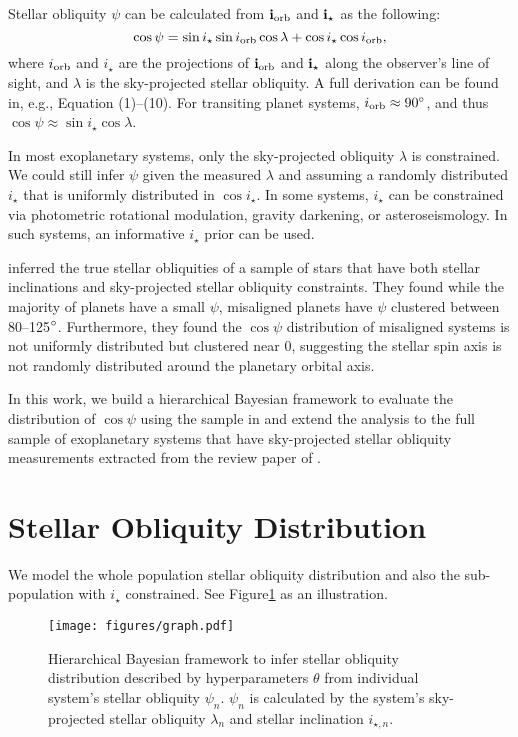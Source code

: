 \documentclass[twocolumn]{aastex631}
\begin{document}
Stellar obliquity $\psi$ can be calculated from $\bf{i}_{\rm orb}$ and $\bf{i}_{\star}$ as the following:
\begin{equation}
    \cos{\psi} = \sin{i_\star}\sin{i_{\rm orb}}\cos{\lambda} + \cos{i_\star}\cos{i_{\rm orb}},
\end{equation}
where $i_{\rm orb}$ and $i_\star$ are the projections of $\bf{i}_{\rm orb}$ and $\bf{i}_{\star}$ along the observer's line of sight, and $\lambda$ is the sky-projected stellar obliquity. A full derivation can be found in, e.g., \cite{Fabrycky09} Equation (1)--(10).
For transiting planet systems, $i_{\rm orb} \approx 90\mbox{$^\circ$}$, and thus $\cos{\psi} \approx \sin{i_\star}\cos{\lambda}$.

In most exoplanetary systems, only the sky-projected obliquity $\lambda$ is constrained. We could still infer $\psi$ given the measured $\lambda$ and assuming a randomly distributed $i_\star$ that is uniformly distributed in $\cos{i_\star}$.
In some systems, $i_\star$ can be constrained via photometric rotational modulation, gravity darkening, or asteroseismology. In such systems, an informative $i_\star$ prior can be used.

\cite{Albrecht21} inferred the true stellar obliquities of a sample of stars that have both stellar inclinations and sky-projected stellar obliquity constraints. They found while the majority of planets have a small $\psi$, misaligned planets have $\psi$ clustered between 80--125$\mbox{$^\circ$}$. Furthermore, they found the $\cos{\psi}$ distribution of misaligned systems is not uniformly distributed but clustered near 0, suggesting the stellar spin axis is not randomly distributed around the planetary orbital axis.

In this work, we build a hierarchical Bayesian framework to evaluate the distribution of $\cos{\psi}$ using the sample in \cite{Albrecht21} and extend the analysis to the full sample of exoplanetary systems that have sky-projected stellar obliquity measurements extracted from the review paper of \cite{Albrecht22}.

\section{Stellar Obliquity Distribution} \label{sec:hbm}
We model the whole population stellar obliquity distribution and also the sub-population with $i_\star$ constrained. See Figure\ref{fig:graph} as an illustration. 

\begin{figure}[ht!]
    \texttt{[image: figures/graph.pdf]}
    \caption{Hierarchical Bayesian framework to infer stellar obliquity distribution described by hyperparameters $\theta$ from individual system's stellar obliquity $\psi_n$. $\psi_n$ is calculated by the system's sky-projected stellar obliquity $\lambda_n$ and stellar inclination $i_{\star, n}$.}
    \label{fig:graph}
\end{figure}
\end{document}
